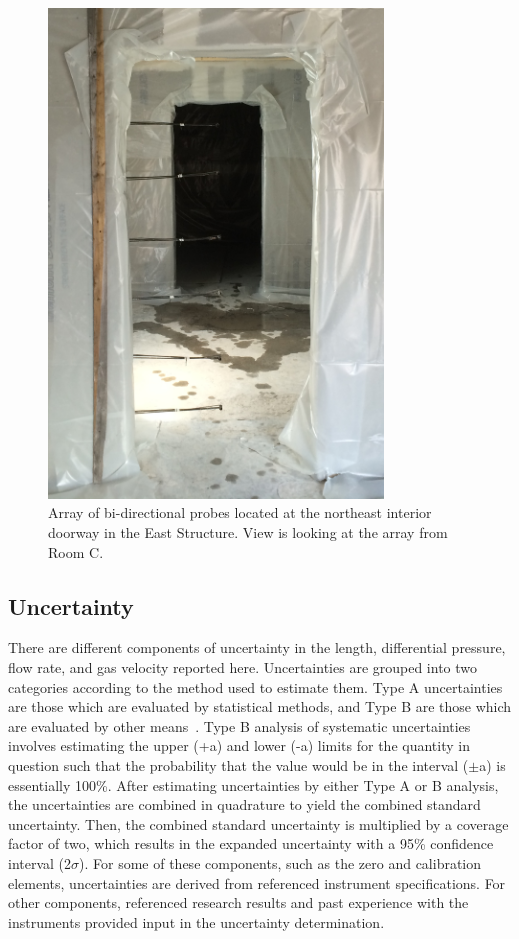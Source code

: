 \documentclass[12pt,oneside]{book}
\begin{document}
\begin{figure}[!ht]
	\includegraphics[width=3.5in]{../Figures/Pictures/BDPs_east}
	\caption[Array of bi-directional probes at interior doorway in East Structure.]{Array of bi-directional probes located at the northeast interior doorway in the East Structure. View is looking at the array from Room C.}
	\label{fig:BDPs}
\end{figure}
\FloatBarrier

\subsection{Uncertainty}
\label{sec:uncertainty}
There are different components of uncertainty in the length, differential pressure, flow rate, and gas velocity reported here. Uncertainties are grouped into two categories according to the method used to estimate them. Type A uncertainties are those which are evaluated by statistical methods, and Type B are those which are evaluated by other means~\cite{Taylor&Kuyatt:1994}. Type B analysis of systematic uncertainties involves estimating the upper (+a) and lower (-a) limits for the quantity in question such that the probability that the value would be in the interval ($\pm$a) is essentially 100\%. After estimating uncertainties by either Type A or B analysis, the uncertainties are combined in quadrature to yield the combined standard uncertainty. Then, the combined standard uncertainty is multiplied by a coverage factor of two, which results in the expanded uncertainty with a 95\% confidence interval (2$\sigma$). For some of these components, such as the zero and calibration elements, uncertainties are derived from referenced instrument specifications. For other components, referenced research results and past experience with the instruments provided input in the uncertainty determination. 
\end{document}
